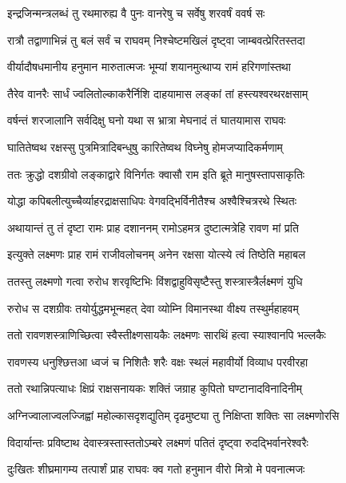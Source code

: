 \twolineshloka
{इन्द्रजिन्मन्त्रलब्धं तु रथमारुह्य वै पुनः}
{वानरेषु च सर्वेषु शरवर्षं ववर्ष सः} %

\twolineshloka
{रात्रौ तद्वाणाभिन्नं तु बलं सर्वं च राघवम्}
{निश्चेष्टमखिलं दृष्ट्वा जाम्बवत्प्रेरितस्तदा} %

\twolineshloka
{वीर्यादौषधमानीय हनुमान मारुतात्मजः}
{भूम्यां शयानमुत्थाप्य रामं हरिगणांस्तथा} %

\twolineshloka
{तैरेव वानरैः सार्धं ज्वलितोल्काकरैर्निशि}
{दाहयामास लङ्कां तां हस्त्यश्वरथरक्षसाम्} %

\twolineshloka
{वर्षन्तं शरजालानि सर्वदिक्षु घनो यथा}
{स भ्रात्रा मेघनादं तं घातयामास राघवः} %

\twolineshloka
{घातितेष्वथ रक्षस्सु पुत्रमित्रादिबन्धुषु}
{कारितेष्वथ विघ्नेषु होमजप्यादिकर्मणाम्} %

\twolineshloka
{ततः क्रुद्धो दशग्रीवो लङ्काद्वारे विनिर्गतः}
{क्वासौ राम इति ब्रूते मानुषस्तापसाकृतिः} %

\twolineshloka
{योद्धा कपिबलीत्युच्चैर्व्याहरद्राक्षसाधिपः}
{वेगवद्भिर्विनीतैश्च अश्वैश्चित्ररथे स्थितः} %

\twolineshloka
{अथायान्तं तु तं दृष्टा रामः प्राह दशाननम्}
{रामोऽहमत्र दुष्टात्मत्रेहि रावण मां प्रति} %

\twolineshloka
{इत्युक्ते लक्ष्मणः प्राह रामं राजीवलोचनम्}
{अनेन रक्षसा योत्स्ये त्वं तिष्ठेति महाबल} %

\twolineshloka
{ततस्तु लक्ष्मणो गत्वा रुरोध शरवृष्टिभिः}
{विंशद्वाहुविसृष्टैस्तु शस्त्रास्त्रैर्लक्ष्मणं युधि} %

\twolineshloka
{रुरोध स दशग्रीवः तयोर्युद्धमभून्महत्}
{देवा व्योम्नि विमानस्था वीक्ष्य तस्थुर्महाहवम्} %

\twolineshloka
{ततो रावणशस्त्राणिच्छित्वा स्वैस्तीक्ष्णसायकैः}
{लक्ष्मणः सारथिं हत्वा स्याश्वानपि भल्लकैः} %

\twolineshloka
{रावणस्य धनुश्छित्तआ ध्वजं च निशितैः शरैः}
{वक्षः स्थलं महावीर्यो विव्याध परवीरहा} %

\twolineshloka
{ततो रथान्निपत्याधः क्षिप्रं राक्षसनायकः}
{शक्तिं जग्राह कुपितो घण्टानादविनादिनीम्} %

\twolineshloka
{अग्निज्वालाज्वलज्जिह्वां महोल्कासदृशद्युतिम्}
{दृढमुष्ट्या तु निक्षिप्ता शक्तिः सा लक्ष्मणोरसि} %

\twolineshloka
{विदार्यान्तः प्रविष्टाथ देवास्त्रस्तास्ततोऽम्बरे}
{लक्ष्मणं पतितं दृष्ट्वा रुदद्भिर्वानरेश्वरैः} %

\twolineshloka
{दुःखितः शीघ्रमागम्य तत्पार्शं प्राह राघवः}
{क्व गतो हनुमान वीरो मित्रो मे पवनात्मजः} %

